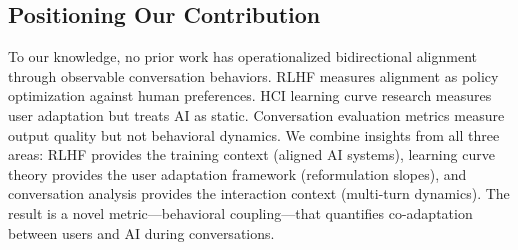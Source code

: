 \subsection{Positioning Our Contribution}

To our knowledge, no prior work has operationalized bidirectional alignment through observable conversation behaviors. RLHF measures alignment as policy optimization against human preferences. HCI learning curve research measures user adaptation but treats AI as static. Conversation evaluation metrics measure output quality but not behavioral dynamics. We combine insights from all three areas: RLHF provides the training context (aligned AI systems), learning curve theory provides the user adaptation framework (reformulation slopes), and conversation analysis provides the interaction context (multi-turn dynamics). The result is a novel metric---behavioral coupling---that quantifies co-adaptation between users and AI during conversations.
